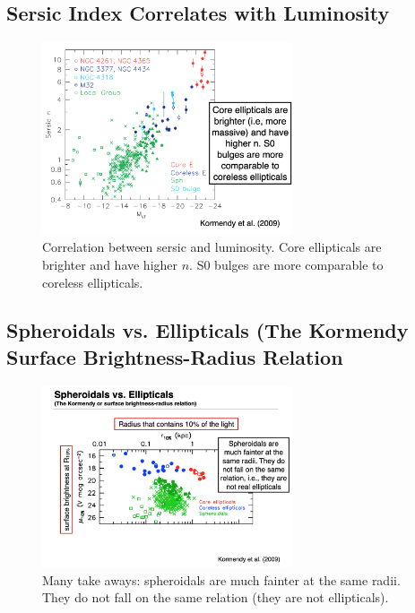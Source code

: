 \documentclass{article}
\begin{document}
\subsection{Sersic Index Correlates with Luminosity}

\begin{figure}
    \centering
\includegraphics[width=0.66\textwidth]{figs/Screen Shot 2021-10-15 at 10.12.18 AM.png}
    \caption{Correlation between sersic and luminosity. Core ellipticals are brighter and have higher $n$. S0 bulges are more comparable to coreless ellipticals.  }
    \label{fig:NeedNewLabel}
\end{figure}

\subsection{Spheroidals vs. Ellipticals (The Kormendy Surface Brightness-Radius Relation}

\begin{figure}
    \centering
\includegraphics[width=0.66\textwidth]{figs/Screen Shot 2021-10-15 at 10.14.37 AM.png}
    \caption{Many take aways: spheroidals are much fainter at the same radii. They do not fall on the same relation (they are not ellipticals). }
    \label{fig:klajdlskjlk}
\end{figure}
\end{document}
